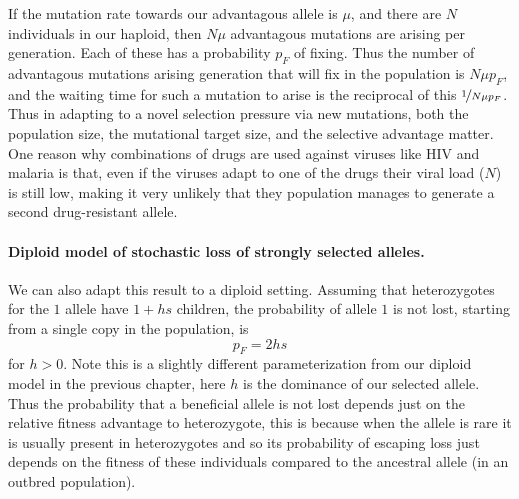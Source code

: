 If the mutation rate towards our advantagous allele is $\mu$, and there
are $N$ individuals in our haploid, then $N \mu$ advantagous mutations are
arising per generation.  Each of these has a probability $p_F$ of
fixing. Thus the number of advantagous mutations
arising generation that will fix in the population is $N \mu p_F$, and
the waiting time for such a mutation to arise is the reciprocal of
this $\nicefrac{1}{N\mu p_F}$. Thus in adapting to a novel selection
pressure via new mutations, both the population size, the mutational
target size, and the selective advantage matter. One reason why combinations of drugs
are used against viruses like HIV and malaria is that, even if the viruses adapt to one
of the drugs their viral load ($N$) is still low, making it very
unlikely that they population manages to generate a second drug-resistant allele.

\paragraph{Diploid model of stochastic loss of strongly selected alleles.}
We can also adapt this result to a diploid setting.
Assuming that heterozygotes for the $1$ allele have $1+hs$ children, the
probability of allele $1$ is not lost, starting from a single copy in
the population, is
\begin{equation}
p_F = 2 h s \label{eqn:diploid_escape}
\end{equation}
for $h>0$. Note this is a slightly different parameterization from
our diploid model in the previous chapter, here $h$ is the dominance of our selected
allele. Thus the probability that a beneficial allele is not lost depends just
on the relative fitness advantage to heterozygote, this is because
when the allele is rare it is usually present in heterozygotes and so
its probability of escaping loss just depends on the fitness of these
individuals compared to the ancestral allele (in an
outbred population). \\

